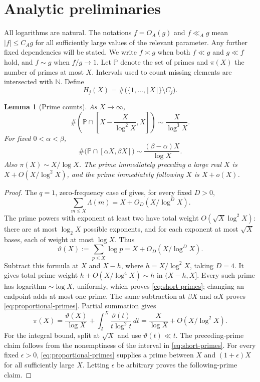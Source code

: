 \documentclass[11pt,letterpaper]{article}
\numberwithin{equation}{section}
\newtheorem{lemma}[theorem]{Lemma}
\theoremstyle{remark}
\newcommand{\N}{\mathbb N}
\newcommand{\Pp}{\mathbb P}
\newcommand{\floor}[1]{\lfloor #1\rfloor}
\begin{document}
\section{Analytic preliminaries}

All logarithms are natural. The notations $f=O_A(g)$ and $f\ll_A g$
mean $|f|\le C_Ag$ for all sufficiently large values of the relevant
parameter. Any further fixed dependencies will be stated. We write
$f\asymp g$ when both $f\ll g$ and $g\ll f$ hold, and $f\sim g$
when $f/g\to1$. Let $\Pp$ denote the set of primes and $\pi(X)$
the number of primes at most $X$. Intervals used to count missing
elements are intersected with $\N$. Define
\[
 H_j(X)=\#\bigl(\{1,\ldots,\floor X\}\setminus C_j\bigr).
\]

\begin{lemma}[Prime counts]\label{lem:pnt}
As $X\to\infty$,
\begin{equation}\label{eq:short-primes}
 \#\left(\Pp\cap\left[X-\frac{X}{\log^2X},X\right]\right)
 \sim\frac{X}{\log^3X}.
\end{equation}
For fixed $0<\alpha<\beta$,
\begin{equation}\label{eq:proportional-primes}
 \#\bigl(\Pp\cap[\alpha X,\beta X]\bigr)
 \sim\frac{(\beta-\alpha)X}{\log X}.
\end{equation}
Also $\pi(X)\sim X/\log X$. The prime immediately preceding a large
real $X$ is $X+O(X/\log^2X)$, and the prime immediately following $X$
is $X+o(X)$.
\end{lemma}

\begin{proof}
The $q=1$, zero-frequency case of \cite[Proposition~24]{Tao} gives,
for every fixed $D>0$,
\[
 \sum_{m\le X}\Lambda(m)=X+O_D(X/\log^D X).
\]
The prime powers with exponent at least two have total weight
$O(\sqrt X\log^2X)$: there are at most $\log_2X$ possible exponents,
and for each exponent at most $\sqrt X$ bases, each of weight at most
$\log X$. Thus
\begin{equation}\label{eq:theta}
 \vartheta(X):=\sum_{p\le X}\log p
 =X+O_D(X/\log^D X).
\end{equation}
Subtract this formula at $X$ and $X-h$, where $h=X/\log^2X$, taking
$D=4$. It gives total prime weight $h+O(X/\log^4X)\sim h$ in
$(X-h,X]$. Every such prime has logarithm $\sim\log X$, uniformly,
which proves \eqref{eq:short-primes}; changing an endpoint adds at most
one prime. The same subtraction at $\beta X$ and $\alpha X$ proves
\eqref{eq:proportional-primes}. Partial summation gives
\[
 \pi(X)=\frac{\vartheta(X)}{\log X}
       +\int_2^X\frac{\vartheta(t)}{t\log^2t}\,dt
 =\frac{X}{\log X}+O(X/\log^2X).
\]
For the integral bound, split at $\sqrt X$ and use $\vartheta(t)\ll t$.
The preceding-prime claim follows from the nonemptiness of the interval
in \eqref{eq:short-primes}. For every fixed $\epsilon>0$,
\eqref{eq:proportional-primes} supplies a prime between $X$ and
$(1+\epsilon)X$ for all sufficiently large $X$. Letting $\epsilon$
be arbitrary proves the following-prime claim.
\end{proof}
\end{document}
